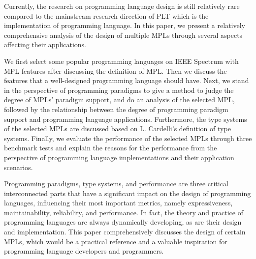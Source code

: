Currently, the research on programming language design is still relatively rare compared to the mainstream research direction of PLT which is the implementation of programming language. In this paper, we present a relatively comprehensive analysis of the design of multiple MPLs through several aspects affecting their applications.

We first select some popular programming languages on IEEE Spectrum with MPL features after discussing the definition of MPL. Then we discuss the features that a well-designed programming language should have. Next, we stand in the perspective of programming paradigms to give a method to judge the degree of MPLs’ paradigm support, and do an analysis of the selected MPL, followed by the relationship between the degree of programming paradigm support and programming language applications. Furthermore, the type systems of the selected MPLs are discussed based on L. Cardelli’s definition of type systems. Finally, we evaluate the performance of the selected MPLs through three benchmark tests and explain the reasons for the performance from the perspective of programming language implementations and their application scenarios.

Programming paradigms, type systems, and performance are three critical interconnected parts that have a significant impact on the design of programming languages, influencing their most important metrics, namely expressiveness, maintainability, reliability, and performance. In fact, the theory and practice of programming languages are always dynamically developing, as are their design and implementation. This paper comprehensively discusses the design of certain MPLs, which would be a practical reference and a valuable inspiration for programming language developers and programmers.
